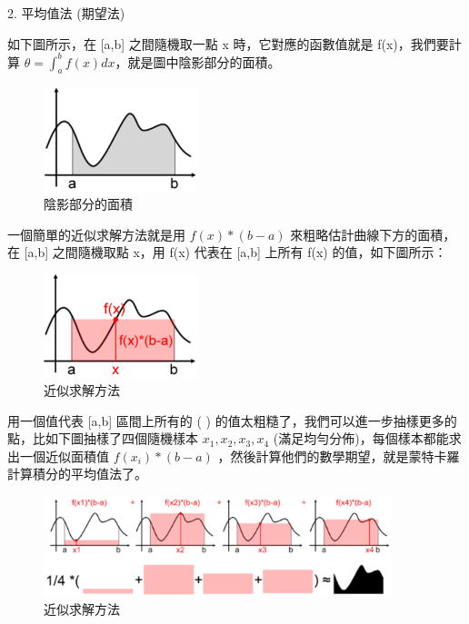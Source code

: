 \documentclass[10pt,UTF8]{ctexart}
\begin{document}
2. 平均值法 (期望法)

如下圖所示，在 [a,b] 之間隨機取一點 x 時，它對應的函數值就是 f(x)，我們要計算 $\theta=\int_{a}^{b} f(x) d x$，就是圖中陰影部分的面積。

\begin{figure}[H]
\centering 
\includegraphics[width=0.40\textwidth]{w15-lab-5.png} 
\caption{陰影部分的面積}
\label{Test}
\end{figure}

一個簡單的近似求解方法就是用 $f(x) *(b-a)$ 來粗略估計曲線下方的面積，在 [a,b] 之間隨機取點 x，用 f(x) 代表在 [a,b] 上所有 f(x) 的值，如下圖所示：

\begin{figure}[H]
\centering 
\includegraphics[width=0.40\textwidth]{w15-lab-6.png} 
\caption{近似求解方法}
\label{Test}
\end{figure}

用一個值代表 [a,b] 區間上所有的 ( ) 的值太粗糙了，我們可以進一步抽樣更多的點，比如下圖抽樣了四個隨機樣本 $x_{1}, x_{2}, x_{3}, x_{4} $ (滿足均勻分佈)，每個樣本都能求出一個近似面積值 $f(x_{i}) * (b - a)$ ，然後計算他們的數學期望，就是蒙特卡羅計算積分的平均值法了。

\begin{figure}[H]
\centering 
\includegraphics[width=0.90\textwidth]{w15-lab-7.png} 
\caption{近似求解方法}
\label{Test}
\end{figure}
\end{document}
